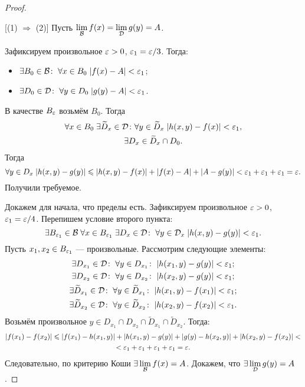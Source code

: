 \documentclass[a4paper, 12pt]{article}
\begin{document}
\begin{proof}\ 

    [(1) $\Rightarrow$ (2)] Пусть $\lim\limits_{\mathcal{B}} f(x) = \lim\limits_{\mathcal{D}} g(y) = A$. 
    \par Зафиксируем произвольное $\varepsilon > 0$, $\varepsilon_1 = \varepsilon/3$. Тогда:
    \begin{itemize}
        \item $\exists B_0\in \mathcal{B}\colon\; \forall x\in B_0\; |f(x) - A| <\varepsilon_1$;
        \item $\exists D_0\in \mathcal{D}\colon\; \forall y\in D_0\; |g(y) - A| <\varepsilon_1$.
    \end{itemize}
    В качестве $B_\varepsilon$ возьмём $B_0$. Тогда
    \begin{gather*}
        \forall x\in B_0\; \exists \widetilde{D}_x \in \mathcal{D}\colon \forall y \in \widetilde{D}_x\; |h(x,y) -f(x)| < \varepsilon_1,\\
        \exists D_x \in \widetilde{D}_x\cap D_0.
    \end{gather*}
    Тогда $$
    \forall y\in D_x\; |h(x,y) - g(y)| \leqslant |h(x,y) - f(x)| + |f(x) - A| + |A- g(y)| < \varepsilon_1 + \varepsilon_1 + \varepsilon_1 = \varepsilon.
    $$
    Получили требуемое.
    \par [$(2) \Rightarrow (1)$] Докажем для начала, что пределы есть. Зафиксируем произвольное $\varepsilon > 0$, $\varepsilon_1 = \varepsilon/4$. Перепишем условие второго пункта:
    $$
        \exists B_{\varepsilon_1} \in \mathcal{B}\; \forall x\in B_{\varepsilon_1}\; \exists D_x \in \mathcal{D}\colon\;  \forall y \in \mathcal{D}_x \; |h(x,y) - g(y)| < \varepsilon_1.
    $$
    Пусть $x_1, x_2 \in B_{\varepsilon_1}$ --- произвольные. Рассмотрим следующие элементы:
    \begin{gather*}
        \exists D_{x_1} \in \mathcal{D}\colon \; \forall y\in D_{x_1}\colon \; |h(x_1,y) - g(y)|<\varepsilon_1;\\
        \exists D_{x_2}\in \mathcal{D}\colon \; \forall y \in D_{x_2}\colon \; |h(x_2, y) - g(y)| < \varepsilon_1;\\
        \exists \widetilde{D}_{x_1}\in \mathcal{D}\colon \; \forall y\in \widetilde{D}_{x_1}\colon \; |h(x_1,y) - f(x_1)| < \varepsilon_1;\\
        \exists \widetilde{D}_{x_2} \in \mathcal{D}\colon \; \forall y\in \widetilde{D}_{x_2}\colon \; |h(x_2,y) - f(x_2)| < \varepsilon_1.\\
    \end{gather*}
    Возьмём произвольное $y\in D_{x_1} \cap D_{x_2} \cap \widetilde{D}_{x_1}\cap \widetilde{D}_{x_2}$. Тогда:
    \begin{gather}
        |f(x_1) - f(x_2)| \leqslant |f(x_1) - h(x_1, y)| + |h(x_1, y) - g(y)| + |g(y) - h(x_2, y)| + |h(x_2, y) - f(x_2)|<\\ < \varepsilon_1 + \varepsilon_1 + \varepsilon_1 + \varepsilon_1 = \varepsilon.
    \end{gather}
    Следовательно, по критерию Коши $\exists \lim\limits_{\mathcal{B}} f(x) = A$. Докажем, что $\exists \lim \limits_{\mathcal{D}} g(y) = A$. 
    

\end{proof}
\end{document}
